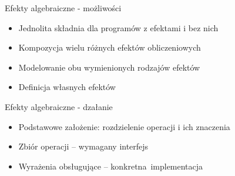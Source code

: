 \documentclass{beamer}
\begin{document}
\begin{frame}{Efekty algebraiczne - możliwości}
  \begin{itemize}
    \item Jednolita składnia dla programów z efektami i bez nich
    \item Kompozycja wielu różnych efektów obliczeniowych
    \item Modelowanie obu wymienionych rodzajów efektów
    \item Definicja własnych efektów
  \end{itemize}
\end{frame}


\begin{frame}{Efekty algebraiczne - dzałanie}
  \begin{itemize}
    \item Podstawowe założenie: rozdzielenie operacji i ich znaczenia
    \item Zbiór operacji -- wymagany interfejs
    \item Wyrażenia obsługujące -- konkretna implementacja
  \end{itemize}
\end{frame}
\end{document}

